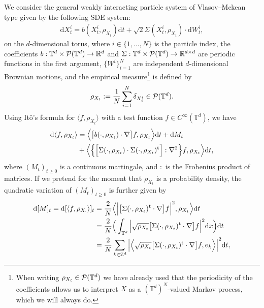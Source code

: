 We consider the general weakly interacting particle system of Vlasov--Mckean type given by the following SDE system:
\begin{align}\label{eq:def-IPS}
\mathrm{d}X^i_t = b(X_t^i, {\rho}_{X_t})\mathrm{d}t +\sqrt{2}\Sigma(X_t^i, {\rho}_{X_t})\cdot \mathrm{d}W^i_t, 
\end{align}
on the $d$-dimensional torus, where $i \in  \{1, ..., N\}$ is the particle index, the coefficients $b: \mathbb{T}^d \times \mathcal{P}(\mathbb{T}^d) \to \mathbb{R}^{d}$ and $\Sigma: \mathbb{T}^d \times \mathcal{P}(\mathbb{T}^d) \to \mathbb{R}^{d\times d}$ are periodic functions in the first argument, $\{W^i\}_{i=1}^N$ are independent $d$-dimensional Brownian motions,  and the empirical measure\footnote{When writing ${\rho}_{X_t} \in \mathcal{P}(\mathbb{T}^d)$ we have already used that the periodicity of the coefficients allows us to interpret $X$ as a $(\mathbb{T}^d)^N$-valued Markov process, which we will always do.}  is defined by
\begin{equation*}
{\rho}_{X_t} := \frac{1}{N} \sum_{i=1}^N \delta_{X_t^i} \in \mathcal{P}(\mathbb{T}^d).
\end{equation*}
Using It\^o's formula for $\langle f, {\rho}_{X_t} \rangle$ with a test function $f \in C^{\infty}(\mathbb{T}^d)$, we have
\begin{equation*}
\begin{split}
    \mathrm{d}\langle f, {\rho}_{X_t}\rangle & = \Big\langle \big[b(\cdot, {\rho}_{X_t}) \cdot \nabla\big] f, {\rho}_{X_t} \Big\rangle \mathrm{d}t + \mathrm{d}M_t \\
    & + \Big\langle \Big\{\Big[\Sigma (\cdot, {\rho}_{X_t})  \cdot \Sigma (\cdot, {\rho}_{X_t})^{\operatorname{t}}\Big] : \nabla^2 \Big\}f, {\rho}_{X_t} \Big\rangle \mathrm{d}t,
   \end{split}
\end{equation*} 
where $(M_t)_{t \geq 0}$ is a continuous martingale, and $:$ is the Frobenius product of matrices. If we pretend for the moment that $\rho_{X_t}$ is a probability density, the quadratic variation of $(M_t)_{t \geq 0}$ is further given by
\begin{align*}
    \mathrm{d}[M]_t = \mathrm{d}[\langle f, {\rho}_{X_{\cdot}}\rangle]_t 
    & = \frac{2}{N}\Big \langle \Big|\big[\Sigma (\cdot, {\rho}_{X_t})^{\operatorname{t}} \cdot \nabla\big]f\Big|^2, {\rho}_{X_t} \Big\rangle \mathrm{d}t\\
    & = \frac{2}{N}\Big(\int_{\mathbb{T}^d}\Big|\sqrt{{\rho}_{X_t}}\big[\Sigma (\cdot, {\rho}_{X_t})^{\operatorname{t}} \cdot \nabla\big]f\Big|^2\mathrm{d}x\Big)\mathrm{d}t\\
    & = \frac{2}{N} \sum_{k \in \mathbb{Z}^d}\Big|\Big\langle\sqrt{{\rho}_{X_t}}\big[\Sigma (\cdot, {\rho}_{X_t})^{\operatorname{t}} \cdot \nabla\big]f, e_k\Big\rangle\Big|^2\mathrm{d}t,
\end{align*}

